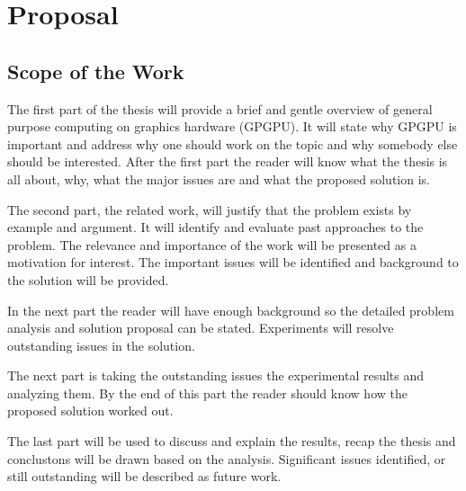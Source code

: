\chapter{Proposal}
\label{ch:proposal}

\section*{Scope of the Work} %
\label{sec:scope_of_the_work}

The first part of the thesis will provide a brief and gentle overview of general
purpose computing on graphics hardware (GPGPU). It will state why \gls{GPGPU}  is
important and address why one should work on the topic and why somebody else
should be interested. After the first part the reader will know what the thesis
is all about, why, what the major issues are and what the proposed solution is.

The second part, the related work, will justify that the problem exists by
example and argument. It will identify and evaluate past approaches to the
problem. The relevance and importance of the work will be presented as a
motivation for interest. The important issues will be identified and background
to the solution will be provided.

In the next part the reader will have enough background so the detailed problem
analysis and solution proposal can be stated. Experiments will resolve
outstanding issues in the solution.

The next part is taking the outstanding issues the experimental results and
analyzing them. By the end of this part the reader should know how the proposed
solution worked out.

The last part will be used to discuss and explain the results, recap the thesis
and conclustons will be drawn based on the analysis. Significant issues
identified, or still outstanding will be described as future work.



